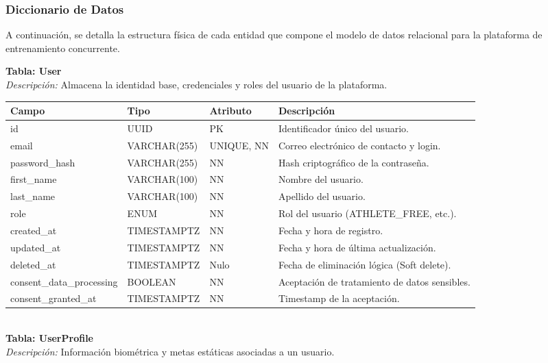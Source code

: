 \documentclass[12pt]{article}
\begin{document}
\newpage
\subsubsection{Diccionario de Datos}
A continuación, se detalla la estructura física de cada entidad que compone el modelo de datos relacional para la plataforma de entrenamiento concurrente.

\noindent\textbf{Tabla: User} \\
\textit{Descripción:} Almacena la identidad base, credenciales y roles del usuario de la plataforma.
\begin{table}[h!]
    \centering
    \renewcommand{\arraystretch}{1.2}
    \small
    \begin{tabular}{|p{3.8cm}|p{2.7cm}|p{1.9cm}|p{6.3cm}|}
        \hline
        \rowcolor[HTML]{EFEFEF}
        \textbf{Campo} & \textbf{Tipo} & \textbf{Atributo} & \textbf{Descripción} \\ \hline
        id & UUID & PK & Identificador único del usuario. \\ \hline
        email & VARCHAR(255) & UNIQUE, NN & Correo electrónico de contacto y login. \\ \hline
        password\_hash & VARCHAR(255) & NN & Hash criptográfico de la contraseña. \\ \hline
        first\_name & VARCHAR(100) & NN & Nombre del usuario. \\ \hline
        last\_name & VARCHAR(100) & NN & Apellido del usuario. \\ \hline
        role & ENUM & NN & Rol del usuario (ATHLETE\_FREE, etc.). \\ \hline
        created\_at & TIMESTAMPTZ & NN & Fecha y hora de registro. \\ \hline
        updated\_at & TIMESTAMPTZ & NN & Fecha y hora de última actualización. \\ \hline
        deleted\_at & TIMESTAMPTZ & Nulo & Fecha de eliminación lógica (Soft delete). \\ \hline
        consent\_data\_processing & BOOLEAN & NN & Aceptación de tratamiento de datos sensibles. \\ \hline
        consent\_granted\_at & TIMESTAMPTZ & NN & Timestamp de la aceptación. \\ \hline
    \end{tabular}
\end{table}
\\
\noindent\textbf{Tabla: UserProfile} \\
\textit{Descripción:} Información biométrica y metas estáticas asociadas a un usuario.
\end{document}
